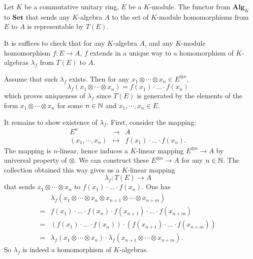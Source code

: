 \begin{theoremenv}
    Let $K$ be a commutative unitary ring, $E$ be a $K$-module.
    The functor from $\mathbf{Alg}_{K}$ to $\mathbf{Set}$ that sends any $K$-algebra $A$ to the set of $K$-module homomorphisms from $E$ to $A$ is representable by $T(E)$.
\end{theoremenv}
\begin{proofenv}
    It is suffices to check that for any $K$-algebra $A$, and any $K$-module homomorphism $f: E \rightarrow A$, $f$ extends in a unique way to a homomorphism of $K$-algebras $\lambda_f$ from $T(E)$ to $A$.

    \quad Assume that such $\lambda_f$ exists.
    Then for any $x_1 \otimes \cdots \otimes x_n \in E^{\otimes n}$,
    $$ \lambda_f \left(x_1 \otimes \cdots \otimes x_n\right) = f \left(x_1\right) \cdot \ldots \cdot f \left(x_n\right)$$
    which proves uniqueness of $\lambda_f$ since $T(E)$ is generated by the elements of the form $x_1 \otimes \cdots \otimes x_n$ for some $n\in \mathbb{N}$ and $x_1, \cdots, x_n \in E$.

    \quad It remains to show existence of $\lambda_f$.
    First, consider the mapping:
    $$\begin{array}{rcl}
        E^n & \longrightarrow & A\\
        (x_1, \cdots, x_n) & \longmapsto & f(x_1) \cdot \ldots \cdot f(x_n).
    \end{array}$$
    The mapping is $n$-linear, hence induces a $K$-linear mapping $E^{\otimes n} \rightarrow A$ by universal property of $\otimes$.
    We can construct these $E^{\otimes n} \rightarrow A$ for any $n\in \mathbb{N}$.
    The collection obtained this way gives us a $K$-linear mapping
    $$ \lambda_f : T(E) \longrightarrow A$$
    that sends $x_1 \otimes \cdots \otimes x_n$ to $f(x_1) \cdot \ldots \cdot f(x_n).$
    One has 
    $$\begin{aligned}
        &\lambda_f \left(x_1 \otimes \cdots \otimes x_n \otimes x_{n+1} \otimes \cdots \otimes x_{n+m}\right)\\
        = & f(x_1) \cdot \ldots \cdot f(x_n) \cdot f(x_{n+1}) \cdot \ldots \cdot f(x_{n+m})\\
        = & \left(f(x_1) \cdot \ldots \cdot f(x_n)\right) \cdot \left(f(x_{n+1}) \cdot \ldots \cdot f(x_{n+m})\right)\\
        =& \lambda_f \left(x_1 \otimes \cdots \otimes x_n\right) \cdot \lambda_f \left(x_{n+1} \otimes \cdots \otimes x_{n+m}\right).
    \end{aligned}$$
    So $\lambda_f$ is indeed a homomorphism of $K$-algebras.
\end{proofenv}

